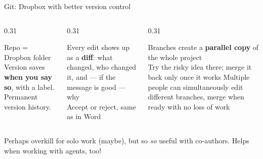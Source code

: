 \documentclass[aspectratio=169, 10pt]{beamer}
\begin{document}
\begin{frame}{Git: Dropbox with better version control}


\vspace{0.15cm}

\begin{columns}[T]
\begin{column}{0.31\textwidth}
\begin{tcolorbox}[keybox, title={\faCloud\quad Like Dropbox}]
\footnotesize
Repo = Dropbox folder\\[4pt]
Version saves \textbf{when you say so}, with a label. Permanent version history. 
\end{tcolorbox}
\end{column}
\begin{column}{0.31\textwidth}
\begin{tcolorbox}[keybox, title={\faEdit\quad Like track changes}]
\footnotesize
Every edit shows up as a \textbf{diff}: what changed, who changed it, and --- if the message is good --- why\\[4pt]
Accept or reject, same as in Word
\end{tcolorbox}
\end{column}
\begin{column}{0.31\textwidth}
\begin{tcolorbox}[keybox, title={\faCodeBranch\quad Plus ... branches!}]
\footnotesize
Branches create a \textbf{parallel copy} of the whole project\\[4pt]
Try the risky idea there; merge it back only once it works
Multiple people can simultaneously edit different branches, merge when ready with no loss of work
\end{tcolorbox}
\end{column}
\end{columns}

\vspace{0.3cm}

\begin{tcolorbox}[accentbox]
\small Perhaps overkill for solo work (maybe), but so \emph{so} useful with co-authors. Helps when working with agents, too!
\end{tcolorbox}

\end{frame}
\end{document}

